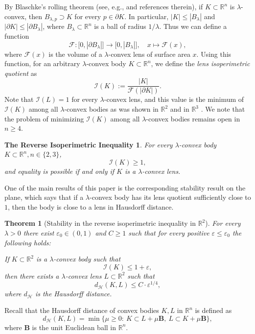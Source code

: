 \documentclass[11pt, oneside]{amsart}
\newcommand{\R}{\mathbb{R}}
\newcommand{\dH}{d_{\mathcal H}}
\newcommand{\Ll}{\mathcal{I}}
\newcommand{\F}{\mathcal{F}}
\newcommand{\B}{{\bm B}}
\newcommand{\eps}{\varepsilon}
\renewcommand{\ge}{\geqslant}
\renewcommand{\le}{\leqslant}
\theoremstyle{theorem}
\newtheorem{MainTheorem}{Theorem}
\newtheorem*{theoremRIP}{The Reverse Isoperimetric Inequality}
\theoremstyle{Intro}
\theoremstyle{definition}
\theoremstyle{remark}
\theoremstyle{claim}
\numberwithin{equation}{section}
\begin{document}
By Blaschke's rolling theorem (see, e.g., \cite{DrBla} and references therein), if $K \subset \R^n$ is $\lambda$-convex, then $B_{\lambda, p} \supset K$ for every $p \in \partial K$. In particular, $|K| \le |B_\lambda|$ and $|\partial K| \le |\partial B_\lambda|$, where $B_\lambda \subset \R^n$ is a ball of radius $1/\lambda$. Thus we can define a function 
\[
\F \colon \big[0, |\partial B_\lambda|\big] \to \big[0, |B_\lambda|\big], \quad x \mapsto \F(x),
\]
where $\F(x)$ is the volume of a $\lambda$-convex lens of surface area $x$. Using this function, for an arbitrary $\lambda$-convex body $K \subset \R^n$, we define the \emph{lens isoperimetric quotient} as
\[
\Ll(K) := \frac{|K|}{\F(|\partial K|)}.
\] 
Note that $\Ll(L) = 1$ for every $\lambda$-convex lens, and this value is the minimum of $\Ll(K)$ among all $\lambda$-convex bodies as was shown in $\R^2$ \cite{BorDr14, DrTa, FKV}  and in $\R^3$ \cite{DrTa}. We note that the problem of minimizing $\Ll(K)$ among all  $\lambda$-convex bodies remains open in $n \ge 4$. 

\begin{theoremRIP}
For every $\lambda$-convex body $K \subset \R^n, n \in \{2,3\}$, 
\[
\Ll(K) \ge 1,
\]
and equality is possible if and only if $K$ is a $\lambda$-convex lens.
\end{theoremRIP}

One of the main results of this paper is the corresponding stability result on the plane, which says that if a $\lambda$-convex body has its lens quotient sufficiently close to $1$, then the body is close to a lens in  Hausdorff distance.  

\begin{MainTheorem}[Stability in the reverse isoperimetric inequality in $\R^2$]
\label{Thm:A}
For every $\lambda > 0$ there exist $\eps_0  \in  (0,1)$ and $C \ge 1$ such that for every positive $\eps \le \eps_0$ the following holds: 

If $K \subset \R^2$ is a $\lambda$-convex body such that
\begin{equation}
\label{Eq:Approx}
\Ll(K) \le 1+\eps,
\end{equation}
then there exists a $\lambda$-convex lens $L \subset \R^2$ such that
\[
\dH(K, L) \le C \cdot \eps^{1/4},
\]
where $\dH$ is the Hausdorff distance.
\end{MainTheorem}

Recall that the Hausdorff distance of convex bodies $K, L$ in $\R^n$ is defined as
$$
\dH(K,L) = \min\{\mu \ge 0: \ K \subset L + \mu \B, \ L \subset K + \mu \B \},
$$ 
where $\B$ is the unit Euclidean ball in $\mathbb{R}^n$.
\end{document}
